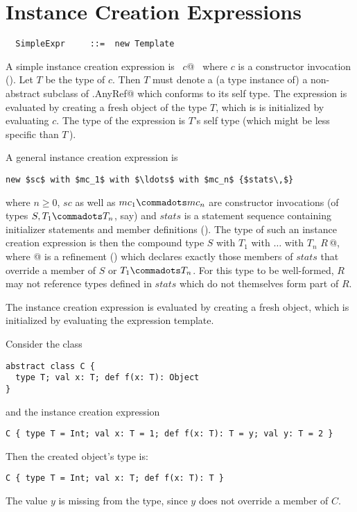 \documentclass[a4paper,12pt,twoside,titlepage]{book}
\begin{document}
\section{Instance Creation Expressions}
\label{sec:inst-creation}

\syntax\begin{lstlisting}
  SimpleExpr     ::=  new Template
\end{lstlisting}

A simple instance creation expression is ~\lstinline@new $c$@~ where $c$
is a constructor invocation ().  Let $T$
be the type of $c$. Then $T$ must denote a (a type instance
of) a non-abstract subclass of \lstinline@scala.AnyRef@ which
conforms to its self type. The expression is evaluated by creating a
fresh object of the type $T$, which is is initialized by
evaluating $c$. The type of the expression is $T$'s self
type (which might be less specific than $T\,$).

A general instance creation expression is
\begin{lstlisting}
new $sc$ with $mc_1$ with $\ldots$ with $mc_n$ {$stats\,$}
\end{lstlisting}
where $n \geq 0$, $sc$ as well as $mc_1 \commadots mc_n$ are
constructor invocations (of types $S, T_1 \commadots T_n$, say) and
$stats$ is a statement sequence containing initializer statements
and member definitions (). The type of such an
instance creation expression is then the compound type
\lstinline@$S$ with $T_1$ with $\ldots$ with $T_n$ {$R\,$}@, where @ is a
refinement () which declares exactly those
members of $stats$ that override a member of $S$ or
$T_1 \commadots T_n$. For this type to be well-formed, $R$
may not reference types defined in $stats$ which do not
themselves form part of $R$.

The instance creation expression is evaluated by creating a fresh
object, which is initialized by evaluating the expression template.

\example Consider the class
\begin{lstlisting}
abstract class C {
  type T; val x: T; def f(x: T): Object
}
\end{lstlisting}
and the instance creation expression
\begin{lstlisting}
C { type T = Int; val x: T = 1; def f(x: T): T = y; val y: T = 2 }
\end{lstlisting}
Then the created object's type is:
\begin{lstlisting}
C { type T = Int; val x: T; def f(x: T): T }
\end{lstlisting}
The value $y$ is missing from the type, since $y$ does not
override a member of $C$.
\end{document}
